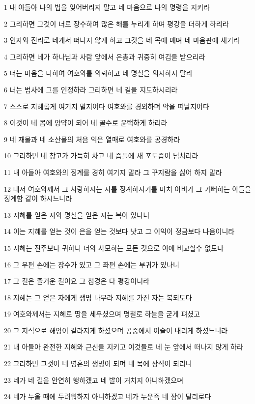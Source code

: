 \par 1 내 아들아 나의 법을 잊어버리지 말고 네 마음으로 나의 명령을 지키라
\par 2 그리하면 그것이 너로 장수하여 많은 해를 누리게 하며 평강을 더하게 하리라
\par 3 인자와 진리로 네게서 떠나지 않게 하고 그것을 네 목에 매며 네 마음판에 새기라
\par 4 그리하면 네가 하나님과 사람 앞에서 은총과 귀중히 여김을 받으리라
\par 5 너는 마음을 다하여 여호와를 의뢰하고 네 명철을 의지하지 말라
\par 6 너는 범사에 그를 인정하라 그리하면 네 길을 지도하시리라
\par 7 스스로 지혜롭게 여기지 말지어다 여호와를 경외하며 악을 떠날지어다
\par 8 이것이 네 몸에 양약이 되어 네 골수로 윤택하게 하리라
\par 9 네 재물과 네 소산물의 처음 익은 열매로 여호와를 공경하라
\par 10 그리하면 네 창고가 가득히 차고 네 즙틀에 새 포도즙이 넘치리라
\par 11 내 아들아 여호와의 징계를 경히 여기지 말라 그 꾸지람을 싫어 하지 말라
\par 12 대저 여호와께서 그 사랑하시는 자를 징계하시기를 마치 아비가 그 기뻐하는 아들을 징계함 같이 하시느니라
\par 13 지혜를 얻은 자와 명철을 얻은 자는 복이 있나니
\par 14 이는 지혜를 얻는 것이 은을 얻는 것보다 낫고 그 이익이 정금보다 나음이니라
\par 15 지혜는 진주보다 귀하니 너의 사모하는 모든 것으로 이에 비교할수 없도다
\par 16 그 우편 손에는 장수가 있고 그 좌편 손에는 부귀가 있나니
\par 17 그 길은 즐거운 길이요 그 첩경은 다 평강이니라
\par 18 지혜는 그 얻은 자에게 생명 나무라 지혜를 가진 자는 복되도다
\par 19 여호와께서는 지혜로 땅을 세우셨으며 명철로 하늘을 굳게 펴셨고
\par 20 그 지식으로 해양이 갈라지게 하셨으며 공중에서 이슬이 내리게 하셨느니라
\par 21 내 아들아 완전한 지혜와 근신을 지키고 이것들로 네 눈 앞에서 떠나지 않게 하라
\par 22 그리하면 그것이 네 영혼의 생명이 되며 네 목에 장식이 되리니
\par 23 네가 네 길을 안연히 행하겠고 네 발이 거치지 아니하겠으며
\par 24 네가 누울 때에 두려워하지 아니하겠고 네가 누운즉 네 잠이 달리로다
